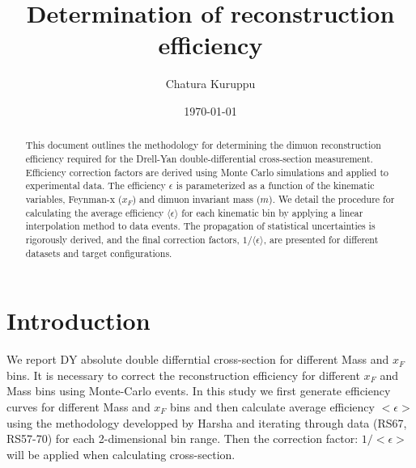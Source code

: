 \documentclass[11pt]{article}
\begin{document}
\title{Determination of reconstruction efficiency}
\author[1]{Chatura Kuruppu}
\date{\today}
\maketitle

\begin{abstract}
\noindent This document outlines the methodology for determining the dimuon reconstruction efficiency required for the Drell-Yan double-differential cross-section measurement. Efficiency correction factors are derived using Monte Carlo simulations and applied to experimental data. The efficiency $\epsilon$ is parameterized as a function of the kinematic variables, Feynman-x ($x_F$) and dimuon invariant mass ($m$). We detail the procedure for calculating the average efficiency $\langle\epsilon\rangle$ for each kinematic bin by applying a linear interpolation method to data events. The propagation of statistical uncertainties is rigorously derived, and the final correction factors, $1/\langle\epsilon\rangle$, are presented for different datasets and target configurations.
\end{abstract}
\clearpage

\tableofcontents
\clearpage

\listoffigures
\clearpage

\listoftables
\clearpage


\section{Introduction}
We report DY absolute double differntial cross-section for different Mass and $x_{F}$ bins. It is necessary to correct the reconstruction efficiency for different $x_{F}$ and Mass bins using Monte-Carlo events. In this study we first generate efficiency curves for different Mass and $x_{F}$ bins and then calculate average efficiency $<\epsilon>$ using the methodology developped by Harsha and iterating through data (RS67, RS57-70) for each 2-dimensional bin range. Then the correction factor: $1/<\epsilon>$ will be applied when calculating cross-section.
\end{document}
